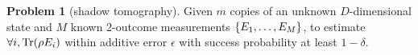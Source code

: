 \documentclass[
aps,
pra,
twocolumn,
floatfix,
]{revtex4-2}
\theoremstyle{plain}
\newtheorem{theorem}{Theorem}
\theoremstyle{definition}
\newtheorem{problem}{Problem}
\newcommand{\ob}{O}
\newcommand{\dm}{\rho}
\begin{document}
\begin{problem}[shadow tomography]\label{prm:shadow_tomography}
	Given $m$ copies of an unknown $D$-dimensional state and $M$ known 2-outcome measurements $\qty{E_1,\dots,E_M}$,
	to estimate $\forall i,\Tr(\dm E_i)$ within additive error $\epsilon$ with success probability at least $1-\delta$.
\end{problem}
\end{document}
